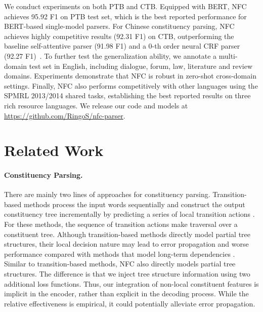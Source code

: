 \documentclass[11pt]{article}
\begin{document}
We conduct experiments on both PTB and CTB. Equipped with BERT, NFC achieves 95.92 F1 on PTB test set, which is the best reported performance for BERT-based single-model parsers. For Chinese constituency parsing, NFC achieves highly competitive results (92.31 F1) on CTB, outperforming the baseline self-attentive parser (91.98 F1) and a 0-th order neural CRF parser (92.27 F1)~\cite{constituency-crf}.
To further test the generalization ability, we annotate a multi-domain test set in English, including dialogue, forum, law, literature and review domains. Experiments demonstrate that NFC is robust in zero-shot cross-domain settings.
Finally, NFC also performs competitively with other languages using the SPMRL 2013/2014 shared tasks, establishing the best reported results on three rich resource languages. 
We release our code and models at \url{https://github.com/RingoS/nfc-parser}.











\section{Related Work}

\paragraph{Constituency Parsing.}
There are mainly two lines of approaches for constituency parsing. 
Transition-based methods process the input words sequentially and construct the output constituency tree incrementally by predicting a series of local transition actions \cite{zhang-clark-2009-transition, cross-huang-2016-span, liu-zhang-2017-order}. 
For these methods, the sequence of transition actions make traversal over a constituent tree.
Although transition-based methods directly model partial tree structures, their local decision nature may lead to error propagation \cite{error-propagation} and worse performance compared with methods that model long-term dependencies \cite{analyzing-dependency, zhang-nivre-2012-analyzing}. 
Similar to transition-based methods, NFC also directly models partial tree structures. 
The difference is that we inject tree structure information using two additional loss functions. 
Thus, our integration of non-local constituent features is implicit in the encoder, rather than explicit in the decoding process. 
While the relative effectiveness is empirical, it could potentially alleviate error propagation.
\end{document}
